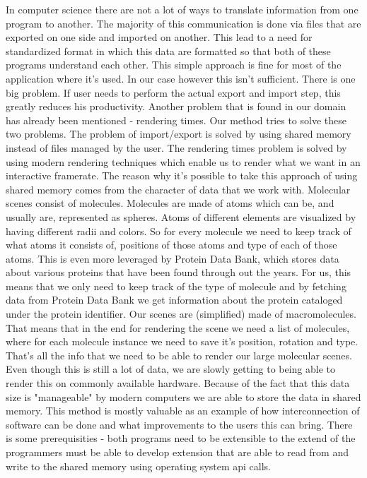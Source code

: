 \documentclass[
  digital, %
  table,   %
  lof,     %
  lot,     %
]{fithesis3}
\begin{document}
In computer science there are not a lot of ways to translate information from one program to another. The majority of this communication is done via files that are exported on one side and imported on another. This lead to a need for standardized format in which this data are formatted so that both of these programs understand each other. This simple approach is fine for most of the application where it's used. In our case however this isn't sufficient. There is one big problem. If user needs to perform the actual export and import step, this greatly reduces his productivity. Another problem that is found in our domain has already been mentioned - rendering times. 
Our method tries to solve these two problems. The problem of import/export is solved by using shared memory instead of files managed by the user. The rendering times problem is solved by using modern rendering techniques which enable us to render what we want in an interactive framerate.
The reason why it's possible to take this approach of using shared memory comes from the character of data that we work with. Molecular scenes consist of molecules. Molecules are made of atoms which can be, and usually are, represented as spheres. Atoms of different elements are visualized by having different radii and colors. So for every molecule we need to keep track of what atoms it consists of, positions of those atoms and type of each of those atoms. This is even more leveraged by Protein Data Bank, which stores data about various proteins that have been found through out the years. For us, this means that we only need to keep track of the type of molecule and by fetching data from Protein Data Bank we get information about the protein cataloged under the protein identifier. Our scenes are (simplified) made of macromolecules. That means that in the end for rendering the scene we need a list of molecules, where for each molecule instance we need to save it's position, rotation and type. That's all the info that we need to be able to render our large molecular scenes. Even though this is still a lot of data, we are slowly getting to being able to render this on commonly available hardware. Because of the fact that this data size is "manageable" by modern computers we are able to store the data in shared memory.
This method is mostly valuable as an example of how interconnection of software can be done and what improvements to the users this can bring. There is some prerequisities - both programs need to be extensible to the extend of the programmers must be able to develop extension that are able to read from and write to the shared memory using operating system api calls.
\end{document}
